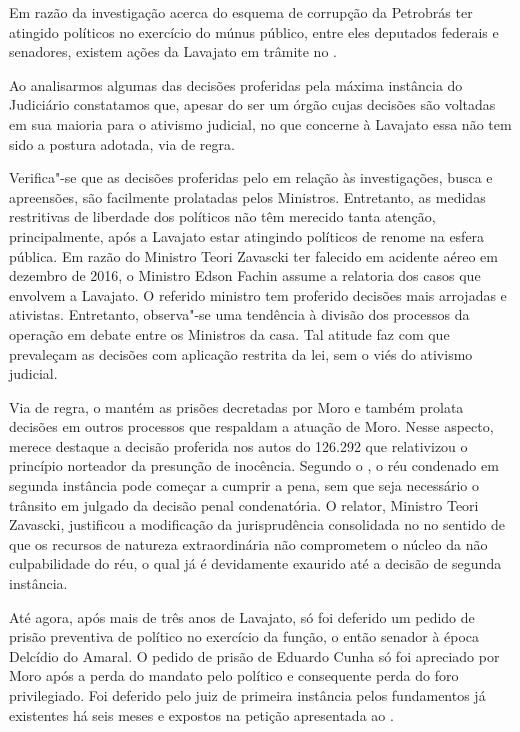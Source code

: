 Em razão da investigação acerca do esquema de corrupção da Petrobrás ter
atingido políticos no exercício do múnus público, entre eles deputados
federais e senadores, existem ações da Lavajato em trâmite no .

Ao analisarmos algumas das decisões proferidas pela máxima instância do
Judiciário constatamos que, apesar do  ser um órgão cujas decisões
são voltadas em sua maioria para o ativismo judicial, no que concerne à
Lavajato essa não tem sido a postura adotada, via de regra.

Verifica"-se que as decisões proferidas pelo  em relação às
investigações, busca e apreensões, são facilmente prolatadas pelos
Ministros. Entretanto, as medidas restritivas de liberdade dos políticos
não têm merecido tanta atenção, principalmente, após a Lavajato estar
atingindo políticos de renome na esfera pública. Em razão do Ministro
Teori Zavascki ter falecido em acidente aéreo em dezembro de 2016, o
Ministro Edson Fachin assume a relatoria dos casos que envolvem a
Lavajato. O referido ministro tem proferido decisões mais arrojadas e
ativistas. Entretanto, observa"-se uma tendência à divisão dos processos
da operação em debate entre os Ministros da casa. Tal atitude faz com
que prevaleçam as decisões com aplicação restrita da lei, sem o viés do
ativismo judicial.

Via de regra, o  mantém as prisões decretadas por Moro e também
prolata decisões em outros processos que respaldam a atuação de Moro.
Nesse aspecto, merece destaque a decisão proferida nos autos do 
126.292 que relativizou o princípio norteador da presunção de inocência.
Segundo o , o réu condenado em segunda instância pode começar a
cumprir a pena, sem que seja necessário o trânsito em julgado da decisão
penal condenatória. O relator, Ministro Teori Zavascki, justificou a
modificação da jurisprudência consolidada no  no sentido de que os
recursos de natureza extraordinária não comprometem o núcleo da não
culpabilidade do réu, o qual já é devidamente exaurido até a decisão de
segunda instância.

Até agora, após mais de três anos de Lavajato, só foi deferido um pedido
de prisão preventiva de político no exercício da função, o então senador
à época Delcídio do Amaral. O pedido de prisão de Eduardo Cunha só foi
apreciado por Moro após a perda do mandato pelo político e consequente
perda do foro privilegiado. Foi deferido pelo juiz de primeira instância
pelos fundamentos já existentes há seis meses e expostos na petição
apresentada ao .

